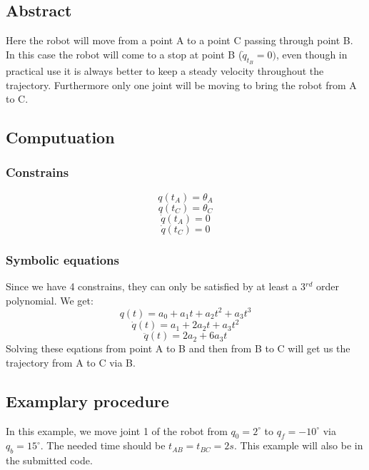 \documentclass{article}
\begin{document}
	\subsection{Abstract}
	Here the robot will move from a point A to a point C passing through point B. In this case the robot will come to a stop at point B ($\dot{q}_{t_{B}} = 0)$, even though in practical use it is always better to keep a steady velocity throughout the trajectory. Furthermore only one joint will be moving to bring the robot from A to C.
	\subsection{Computuation}
	\subsubsection{Constrains}
	\begin{equation}
	q(t_{A})= \theta_{A}
	\end{equation}
	\begin{equation}
	q(t_{C})= \theta_{C}
	\end{equation}
	\begin{equation}
	\dot{q}(t_{A})= 0
	\end{equation}
	\begin{equation}
	\dot{q}(t_{C})= 0
	\end{equation}
	\subsubsection{Symbolic equations}
	Since we have 4 constrains, they can only be satisfied by at least a 3$^{rd}$ order polynomial. We get:
	\begin{equation}
	q(t) = a_0 +a_1t+a_2t^2+a_3t^3
	\end{equation}
	\begin{equation}
	\dot{q}(t) = a_1+2a_2t+a_3t^2
	\end{equation}
	\begin{equation}
	\ddot{q}(t) = 2a_2+6a_3t
	\end{equation}
	Solving these eqations from point A to B and then from B to C will get us the trajectory from A to C via B.
	\subsection{Examplary procedure}
	In this example, we move joint 1 of the robot from $q_0 = 2^{\circ}$ to $q_f = -10^{\circ}$ via $q_b = 15^{\circ}$. The needed time should be $t_{AB} = t_{BC} = 2s$. This example will also be in the submitted code.
\end{document}
